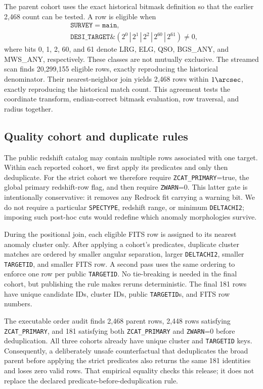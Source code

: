 \documentclass[twocolumn]{aastex701}
\begin{document}
The parent cohort uses the exact historical bitmask definition so that the earlier 2,468 count
can be tested.  A row is eligible when
\begin{equation}
\begin{split}
&\texttt{SURVEY}=\texttt{main},\\
&\texttt{DESI\_TARGET}\mathbin{\&}
\left(2^0\,|\,2^1\,|\,2^2\,|\,2^{60}\,|\,2^{61}\right)\ne0,
\end{split}
\end{equation}
where bits 0, 1, 2, 60, and 61 denote LRG, ELG, QSO, BGS\_ANY, and MWS\_ANY, respectively.
These classes are not mutually exclusive.  The streamed scan finds 20,299,155 eligible rows,
exactly reproducing the historical denominator.  Their nearest-neighbor join yields 2,468 rows
within $1\arcsec$, exactly reproducing the historical match count.  This agreement tests the
coordinate transform, endian-correct bitmask evaluation, row traversal, and radius together.

\subsection{Quality cohort and duplicate rules}\label{sec:quality-selection}

The public redshift catalog may contain multiple rows associated with one target.  Within each
reported cohort, we first apply its predicates and only then deduplicate.  For the strict cohort
we therefore require \texttt{ZCAT\_PRIMARY}=true, the global primary redshift-row flag, and then
require
\texttt{ZWARN}=0.  This latter gate is intentionally conservative: it removes any Redrock fit
carrying a warning bit.  We do not require a particular \texttt{SPECTYPE}, redshift range, or
minimum \texttt{DELTACHI2}; imposing such post-hoc cuts would redefine which anomaly morphologies
survive.

During the positional join, each eligible FITS row is assigned to its nearest anomaly cluster
only.  After applying a cohort's predicates, duplicate cluster matches are ordered by smaller angular separation, larger
\texttt{DELTACHI2}, smaller \texttt{TARGETID}, and smaller FITS row.  A second pass uses the same
ordering to enforce one row per public \texttt{TARGETID}.  No tie-breaking is needed in the final
cohort, but publishing the rule makes reruns deterministic.  The final 181 rows have unique
candidate IDs, cluster IDs, public \texttt{TARGETID}s, and FITS row numbers.

The executable order audit finds 2,468 parent rows, 2,448 rows satisfying
\texttt{ZCAT\_PRIMARY}, and 181 satisfying both \texttt{ZCAT\_PRIMARY} and
\texttt{ZWARN}=0 before deduplication.  All three cohorts already have unique cluster and
\texttt{TARGETID} keys.  Consequently, a deliberately unsafe counterfactual that deduplicates the
broad parent before applying the strict predicates also returns the same 181 identities and loses
zero valid rows.  That empirical equality checks this release; it does not replace the declared
predicate-before-deduplication rule.
\end{document}
